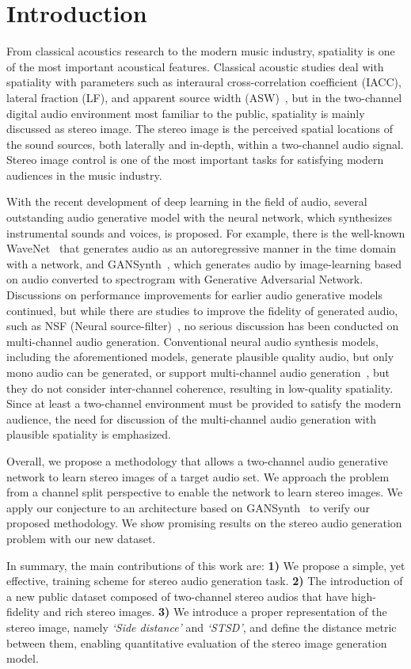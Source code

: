 \section{Introduction}
\label{sec:intro}
From classical acoustics research to the modern music industry, spatiality is one of the most important acoustical features. Classical acoustic studies deal with spatiality with parameters such as interaural cross-correlation coefficient (IACC), lateral fraction (LF), and apparent source width (ASW)~\cite{classic}, but in the two-channel digital audio environment most familiar to the public, spatiality is mainly discussed as stereo image. The stereo image is the perceived spatial locations of the sound sources, both laterally and in-depth, within a two-channel audio signal. Stereo image control is one of the most important tasks for satisfying modern audiences in the music industry.

With the recent development of deep learning in the field of audio, several outstanding audio generative model with the neural network, which synthesizes instrumental sounds and voices, is proposed. For example, there is the well-known WaveNet~\cite{wavenet} that generates audio as an autoregressive manner in the time domain with a network, and GANSynth~\cite{gansynth}, which generates audio by image-learning based on audio converted to spectrogram with Generative Adversarial Network. Discussions on performance improvements for earlier audio generative models continued, but while there are studies to improve the fidelity of generated audio, such as NSF (Neural source-filter)~\cite{nsf}, no serious discussion has been conducted on multi-channel audio generation. Conventional neural audio synthesis models, including the aforementioned models, generate plausible quality audio, but only mono audio can be generated, or support multi-channel audio generation~\cite{wavegan}, but they do not consider inter-channel coherence, resulting in low-quality spatiality. Since at least a two-channel environment must be provided to satisfy the modern audience, the need for discussion of the multi-channel audio generation with plausible spatiality is emphasized.

Overall, we propose a methodology that allows a two-channel audio generative network to learn stereo images of a target audio set. We approach the problem from a channel split perspective to enable the network to learn stereo images. We apply our conjecture to an architecture based on GANSynth~\cite{gansynth} to verify our proposed methodology. We show promising results on the stereo audio generation problem with our new dataset.

In summary, the main contributions of this work are: \textbf{1)} We propose a simple, yet effective, training scheme for stereo audio generation task. \textbf{2)} The introduction of a new public dataset composed of two-channel stereo audios that have high-fidelity and rich stereo images. \textbf{3)} We introduce a proper representation of the stereo image, namely \textit{`Side distance'} and \textit{`STSD'}, and define the distance metric between them, enabling quantitative evaluation of the stereo image generation model.